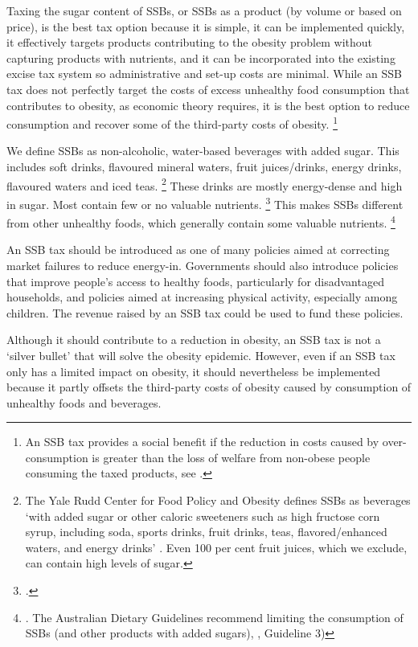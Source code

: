 \documentclass[embargoed]{grattan}
\begin{document}
Taxing the sugar content of SSBs, or SSBs as a product (by volume or based on price), is the best tax option because it is simple, it can be implemented quickly, it effectively targets products contributing to the obesity problem without capturing products with nutrients, and it can be incorporated into the existing excise tax system so administrative and set-up costs are minimal.
While an SSB tax does not perfectly target the costs of excess unhealthy food consumption that contributes to obesity, as economic theory requires, it is the best option to reduce consumption and recover some of the third-party costs of obesity.%
\footnote{An SSB tax provides a social benefit if the reduction in costs caused by over-consumption is greater than the loss of welfare from non-obese people consuming the taxed products, see \textcite{CnossenExcisetaxationAustralia}.}

We define SSBs as non-alcoholic, water-based beverages with added sugar.
This includes soft drinks, flavoured mineral waters, fruit juices/drinks, energy drinks, flavoured waters and iced teas.%
\footnote{The Yale Rudd Center for Food Policy and Obesity defines SSBs as beverages `with added sugar or other caloric sweeteners such as high fructose corn syrup, including soda, sports drinks, fruit drinks, teas, flavored/enhanced waters, and energy drinks' \textcite{Friedman2012Sugarsweetenedbeverage}.
Even 100 per cent fruit juices, which we exclude, can contain high levels of sugar.} These drinks are mostly energy-dense and high in sugar.
Most contain few or no valuable nutrients.%
\footcites{Kaplin2013Usingeconomicpolicy}{Mozaffarian2016politicssciencesoda} This makes SSBs different from other unhealthy foods, which generally contain some valuable nutrients.%
\footnote{\textcite{LordanShouldweput}.
The Australian Dietary Guidelines recommend limiting the consumption of SSBs (and other products with added sugars), \textcite{Health2013AustralianDietaryGuidelines}, Guideline 3)}

An SSB tax should be introduced as one of many policies aimed at correcting market failures to reduce energy-in.
Governments should also introduce policies that improve people's access to healthy foods, particularly for disadvantaged households, and policies aimed at increasing physical activity, especially among children.
The revenue raised by an SSB tax could be used to fund these policies.

Although it should contribute to a reduction in obesity, an SSB tax is not a `silver bullet' that will solve the obesity epidemic.
However, even if an SSB tax only has a limited impact on obesity, it should nevertheless be implemented because it partly offsets the third-party costs of obesity caused by consumption of unhealthy foods and beverages.
\end{document}
